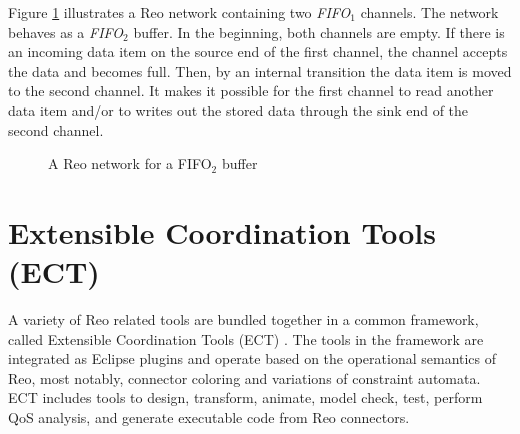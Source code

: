 \begin{BehExample}
Figure \ref{fig:reo2} illustrates a Reo network containing two \emph{FIFO$_1$} channels. The network behaves as a \emph{FIFO$_2$} buffer. In the beginning, both channels are empty. If there is an incoming data item on the source end of the first channel, the channel accepts the data and becomes full. Then, by an internal transition the data item is moved to the second channel. It makes it possible for the first channel to read another data item and/or to writes out the stored data through the sink end of the second channel.

 \begin{figure}[!ht] 
   \centering
    \caption{A Reo network for a FIFO$_2$ buffer}
    \label{fig:reo2}
   \end{figure}      
\end{BehExample}

\section{Extensible Coordination Tools (ECT)}
A variety of Reo related tools are bundled together in a common framework, called Extensible Coordination Tools (ECT) \cite{ect}. The tools in the framework are integrated as Eclipse plugins and operate based on the operational semantics of Reo, most notably, connector coloring and variations of constraint automata. ECT includes tools to design, transform, animate, model check, test, perform QoS analysis, and generate executable code from Reo connectors. 


